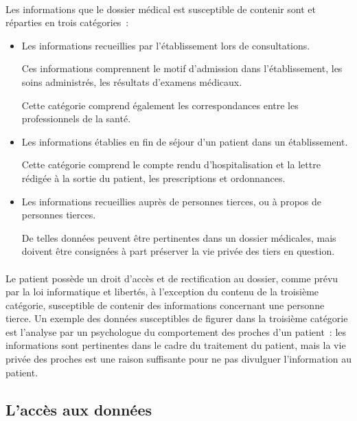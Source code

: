 \paragraph{}
Les informations que le dossier médical est susceptible de contenir sont et
réparties en trois catégories~:

\begin{itemize}
    \item Les informations recueillies par l'établissement lors de
        consultations.

        Ces informations comprennent le motif d'admission dans l'établissement, les
        soins administrés, les résultats d'examens médicaux.

        Cette catégorie comprend également les correspondances entre les
        professionnels de la santé.

    \item Les informations établies en fin de séjour d'un patient dans un
        établissement.

        Cette catégorie comprend le compte rendu d'hospitalisation et la lettre
        rédigée à la sortie du patient, les prescriptions et ordonnances.

    \item Les informations recueillies auprès de personnes tierces, ou à propos
        de personnes tierces.

        De telles données peuvent être pertinentes dans un dossier médicales, mais
        doivent être consignées à part préserver la vie privée des tiers en
        question.
\end{itemize}

\paragraph{}
Le patient possède un droit d'accès et de rectification au dossier, comme prévu
par la loi informatique et libertés, à l'exception du contenu de la troisième
catégorie, susceptible de contenir des informations concernant une personne
tierce. Un exemple des données susceptibles de figurer dans la troisième
catégorie est l'analyse par un psychologue du comportement des proches d'un
patient~: les informations sont pertinentes dans le cadre du traitement du
patient, mais la vie privée des proches est une raison suffisante pour ne pas
divulguer l'information au patient.


        \subsection{L'accès aux données}

